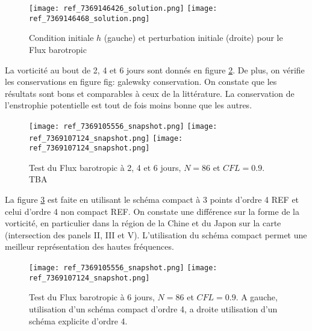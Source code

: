 \begin{figure}[htbp]
\begin{center}
\texttt{[image: ref\_7369146426\_solution.png]}
\texttt{[image: ref\_7369146468\_solution.png]}
\end{center}
\caption{Condition initiale $h$ (gauche) et perturbation initiale (droite) pour le Flux barotropic \cite{Galewsky2004}}
\label{fig: initiale et perturbation Galewsky}
\end{figure}

La vorticité au bout de 2, 4 et 6 jours sont donnés en figure \ref{fig: galewsky 246}. De plus, on vérifie les conservations en figure {fig: galewsky conservation}. On constate que les résultats sont bons et comparables à ceux de la littérature. La conservation de l'enstrophie potentielle est tout de fois moins bonne que les autres.

\begin{figure}[htbp]
\begin{center}
\texttt{[image: ref\_7369105556\_snapshot.png]}
\texttt{[image: ref\_7369107124\_snapshot.png]}
\texttt{[image: ref\_7369107124\_snapshot.png]}
\end{center}
\caption{Test du Flux barotropic \cite{Galewsky2004} à 2, 4 et 6 jours, $N=86$ et $CFL=0.9$. TBA}
\label{fig: galewsky 246}
\end{figure}

La figure \ref{fig: galewsky compact/explicite} est faite en utilisant le schéma compact à 3 points d'ordre 4 REF et celui d'ordre 4 non compact REF. On constate une différence sur la forme de la vorticité, en particulier dans la région de la Chine et du Japon sur la carte (intersection des panels II, III et V). L'utilisation du schéma compact permet une meilleur représentation des hautes fréquences.

\begin{figure}[htbp]
\begin{center}
\texttt{[image: ref\_7369105556\_snapshot.png]}
\texttt{[image: ref\_7369107124\_snapshot.png]}
\end{center}
\caption{Test du Flux barotropic \cite{Galewsky2004} à 6 jours, $N=86$ et $CFL=0.9$. A gauche, utilisation d'un schéma compact d'ordre 4, a droite utilisation d'un schéma explicite d'ordre 4.}
\label{fig: galewsky compact/explicite}
\end{figure}

